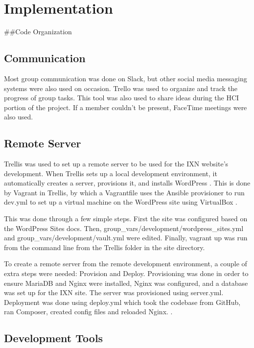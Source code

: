 \documentclass[fontsize=10pt]{extarticle}
\numberwithin{figure}{section} %
\begin{document}
\hypertarget{implementation}{%
\section{Implementation}\label{implementation}}

\#\#Code Organization

\hypertarget{communication}{%
\subsection{Communication}\label{communication}}

Most group communication was done on Slack, but other social media
messaging systems were also used on occasion. Trello was used to
organize and track the progress of group tasks. This tool was also used
to share ideas during the HCI portion of the project. If a member
couldn't be present, FaceTime meetings were also used.

\hypertarget{remote-server}{%
\subsection{Remote Server}\label{remote-server}}

Trellis was used to set up a remote server to be used for the IXN
website's development. When Trellis sets up a local development
environment, it automatically creates a server, provisions it, and
installs WordPress \cite{p21} . This is done by Vagrant in Trellis, by
which a Vagrantfile uses the Ansible provisioner to run dev.yml to set
up a virtual machine on the WordPress site using VirtualBox \cite{p22} .

This was done through a few simple steps. First the site was configured
based on the WordPress Sites docs. Then,
group\_vars/development/wordpress\_sites.yml and
group\_vars/development/vault.yml were edited. Finally, vagrant up was
run from the command line from the Trellis folder in the site directory.

To create a remote server from the remote development environment, a
couple of extra steps were needed: Provision and Deploy. Provisioning
was done in order to ensure MariaDB and Nginx were installed, Nginx was
configured, and a database was set up for the IXN site. The server was
provisioned using server.yml. Deployment was done using deploy.yml which
took the codebase from GitHub, ran Composer, created config files and
reloaded Nginx. \cite{p23}.

\hypertarget{development-tools}{%
\subsection{Development Tools}\label{development-tools}}
\end{document}
